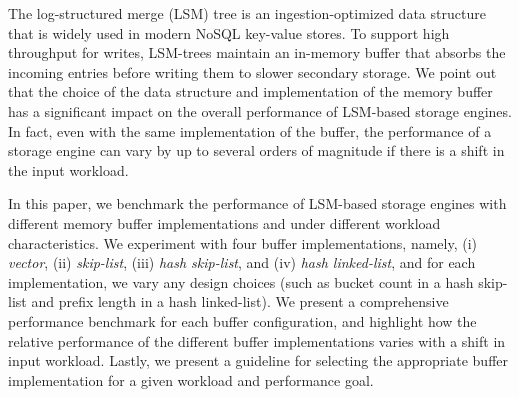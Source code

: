 The log-structured merge (LSM) tree is an ingestion-optimized data structure that is widely used in modern NoSQL key-value stores. 
To support high throughput for writes, LSM-trees maintain an in-memory buffer that absorbs the incoming entries before writing them to slower secondary storage. 
We point out that the choice of the data structure and implementation of the memory buffer has a significant impact on the overall performance of LSM-based storage engines. 
In fact, even with the same implementation of the buffer, the performance of a storage engine can vary by up to several orders of magnitude if there is a shift in the input workload. 

In this paper, we benchmark the performance of LSM-based storage engines with different memory buffer implementations and under different workload characteristics. 
We experiment with four buffer implementations, namely, (i) \textit{vector}, (ii) \textit{skip-list}, (iii) \textit{hash skip-list}, and (iv) \textit{hash linked-list}, and for each implementation, we vary any design choices (such as bucket count in a hash skip-list and prefix length in a hash linked-list). 
We present a comprehensive performance benchmark for each buffer configuration, and highlight how the relative performance of the different buffer implementations varies with a shift in input workload. 
Lastly, we present a guideline for selecting the appropriate buffer implementation for a given workload and performance goal.


 